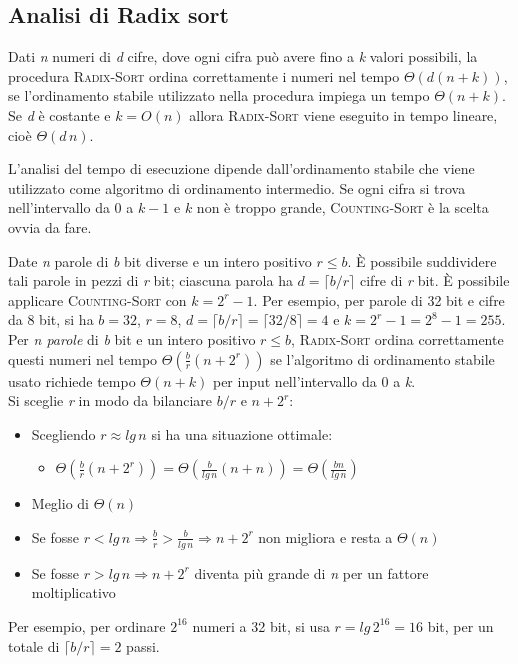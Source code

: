 \documentclass[10pt, a4paper]{report}
\begin{document}
\subsection{Analisi di Radix sort}
Dati \textit{n} numeri di \textit{d} cifre, dove ogni cifra può avere fino a \textit{k} valori possibili, la procedura \textsc{Radix-Sort} ordina correttamente i numeri nel tempo $\Theta(d(n + k))$, se l'ordinamento stabile utilizzato nella procedura impiega un tempo $\Theta(n + k)$. Se \textit{d} è costante e $k = O(n)$ allora \textsc{Radix-Sort} viene eseguito in tempo lineare, cioè $\Theta(d\,n)$.

L'analisi del tempo di esecuzione dipende dall'ordinamento stabile che viene utilizzato come algoritmo di ordinamento intermedio. Se ogni cifra si trova nell'intervallo da 0 a $k - 1$ e $k$ non è troppo grande, \textsc{Counting-Sort} è la scelta ovvia da fare.

Date \textit{n} parole di \textit{b} bit diverse e un intero positivo $r \leq b$. È possibile suddividere tali parole in pezzi di \textit{r} bit; ciascuna parola ha $d = \lceil b/r \rceil$ cifre di \textit{r} bit. È possibile applicare \textsc{Counting-Sort} con $k = 2^r - 1$. Per esempio, per parole di 32 bit e cifre da 8 bit, si ha $b = 32$, $r = 8$, $d = \lceil b/r \rceil = \lceil 32/8 \rceil = 4$ e $k = 2^r -1 = 2^8 - 1 = 255$. Per \textit{n parole} di \textit{b} bit e un intero positivo $r \leq b$, \textsc{Radix-Sort} ordina correttamente questi numeri nel tempo $\Theta(\frac{b}{r}(n + 2^r))$ se l'algoritmo di ordinamento stabile usato richiede tempo $\Theta(n + k)$ per input nell'intervallo da 0 a \textit{k}.\\Si sceglie \textit{r} in modo da bilanciare $b/r$ e $n +2^r$:
\begin{itemize}
\item Scegliendo $r \approx lg\,n$ si ha una situazione ottimale:
\begin{itemize}
\item[]$\Theta(\frac{b}{r}(n + 2^r)) = \Theta(\frac{b}{lg\,n}(n + n)) = \Theta(\frac{bn}{lg\,n})$
\end{itemize}
\item[]Meglio di $\Theta(n)$
\item Se fosse $r < lg\,n \Rightarrow \frac{b}{r} > \frac{b}{lg\,n} \Rightarrow n + 2^r$ non migliora e resta a $\Theta(n)$
\item Se fosse $r > lg\,n \Rightarrow n + 2^r$ diventa più grande di \textit{n} per un fattore moltiplicativo
\end{itemize}
Per esempio, per ordinare $2^{16}$ numeri a 32 bit, si usa $r = lg\,2^{16} = 16$ bit, per un totale di $\lceil b/r \rceil = 2$ passi.
\end{document}

